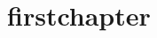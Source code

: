 \chapter{firstchapter}
\cite{knuth1984}
\cite{lamport1994}
\Blindtext
\Blindtext
\Blindtext
\Blindtext
\Blindtext
\Blindtext
\Blindtext
\Blindtext
\Blindtext
